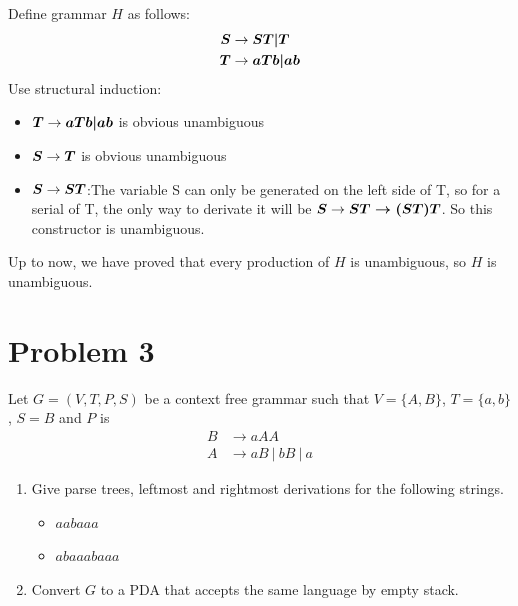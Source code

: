 \documentclass[a4paper,UTF8]{ctexart}
\theoremstyle{definition}
\begin{document}
\begin{multicols}{2}
	
	
	
\end{multicols}

Define grammar $H$ as follows:
\begin{alignat*}{2}
	\apro{S}{ST|T}   \\
	\apro{T}{aTb|ab}
\end{alignat*}
Use structural induction:
\begin{itemize}
	\item $\boldsymbol{T} \rightarrow \boldsymbol{aTb|ab}$ is obvious unambiguous
	\item $\boldsymbol{S} \rightarrow \boldsymbol{T}$ is obvious unambiguous
	\item $\boldsymbol{S} \rightarrow \boldsymbol{ST}$:The variable S can only be generated on the left side of T, so for
	      a serial of T, the only way to derivate it will be $\boldsymbol{S} \rightarrow \boldsymbol{\boldsymbol{ST} \rightarrow \boldsymbol{(ST)T}}$. So this constructor is 
	      unambiguous.
\end{itemize}
Up to now, we have proved that every production of $H$ is unambiguous, so $H$ is unambiguous. 

\section*{Problem 3}
Let $G = (V, T, P, S)$ be a context free grammar such that $V = \{A, B\}$, $T = \{a, b\}$, $S = B$ and $P$ is
\[
	\begin{aligned}
		B & \rightarrow aAA              \\
		A & \rightarrow aB \ |\ bB\ |\ a
	\end{aligned}
\]
\begin{enumerate}
	\item[a.] Give parse trees, leftmost and rightmost derivations for the following strings.
	      \begin{itemize}
		      \item[1.] $aabaaa$
		      \item[2.] $abaaabaaa$
	      \end{itemize}
	\item[b.] Convert $G$ to a PDA that accepts the same language by empty stack.
\end{enumerate}
\end{document}
